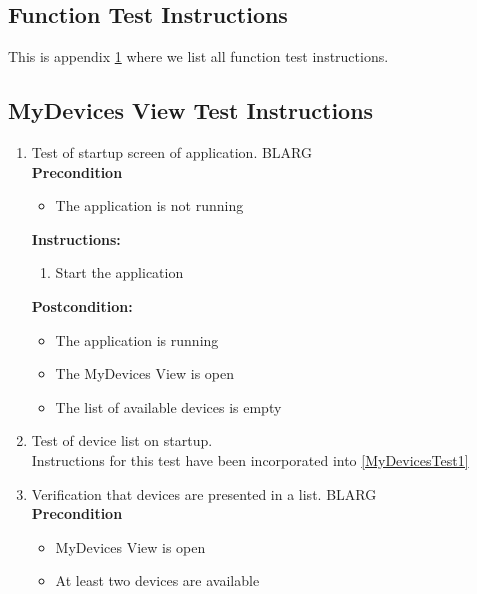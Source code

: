 \documentclass[a4paper]{article}
\newlength{\testlabellength}
\newenvironment{testlist}{\begin{enumerate}[label=\bfseries Instruction \thesubsection.\arabic* , labelindent=0pt, labelwidth=\testlabellength , leftmargin=2cm]}{\end{enumerate}}
\newenvironment{precondition}{
{\color{white}BLARG}\\ 
\textbf{Precondition}
\begin{itemize}[labelindent=0cm, labelwidth=2cm , leftmargin=1cm]
}
{\end{itemize}}
\newenvironment{instruction}{
\textbf{Instructions:}
\begin{enumerate}[label=\bfseries  \arabic*., labelindent=0cm, labelwidth=2cm , leftmargin=1cm]
}
{\end{enumerate}}
\newenvironment{postcondition}{
\textbf{Postcondition:}
\begin{itemize}[labelindent=0cm, labelwidth=2cm , leftmargin=1cm]
}
{\end{itemize}}
\begin{document}
\begin{appendices}

\section{Function Test Instructions} \label{appendix:section:functiontest}
This is appendix \ref{appendix:section:functiontest} where we list all function test instructions.


\subsection{MyDevices View Test Instructions}
\begin{testlist}

    \item Test of startup screen of application. \label{MyDevicesTest1}
    	\begin{precondition}
    		\item The application is not running
    	\end{precondition}
    	\begin{instruction}
			\item Start the application
    	\end{instruction}
    	\begin{postcondition}
    		\item The application is running
    		\item The MyDevices View is open
    		\item The list of available devices is empty
    	\end{postcondition}
    
    
	\item Test of device list on startup. \\
		Instructions for this test have been incorporated into \ref{MyDevicesTest1}
    

    \item Verification that devices are presented in a list.
    	\begin{precondition}
    		\item MyDevices View is open
    		\item At least two devices are available
    	\end{precondition}
    	

\end{testlist}
\end{appendices}
\end{document}
